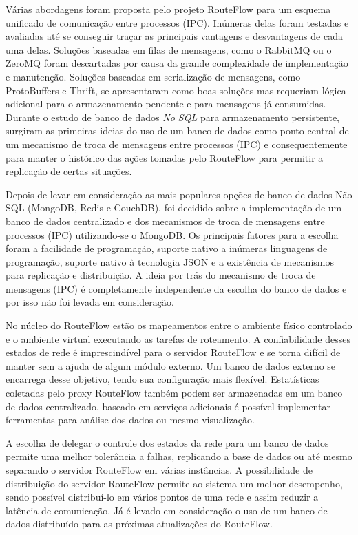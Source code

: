 Várias abordagens foram proposta pelo projeto RouteFlow para um
esquema unificado de comunicação entre processos (IPC). 
Inúmeras delas foram testadas e avaliadas até se conseguir 
traçar as principais vantagens e desvantagens de cada uma delas.
Soluções baseadas em filas de mensagens, como o RabbitMQ
ou o ZeroMQ foram descartadas por causa da grande complexidade
de implementação e manutenção. Soluções baseadas em serialização
de mensagens, como ProtoBuffers e Thrift, se apresentaram como
boas soluções mas requeriam lógica adicional para o armazenamento
pendente e para mensagens já consumidas. Durante o estudo
de banco de dados \textit{No SQL} para armazenamento persistente,
surgiram as primeiras ideias do uso de um banco de dados como
ponto central de um mecanismo de troca de mensagens entre 
processos (IPC) e consequentemente para manter o histórico das 
ações tomadas pelo RouteFlow para permitir a replicação de certas
situações.

Depois de levar em consideração as mais populares opções de 
banco de dados Não SQL (MongoDB, Redis e CouchDB), foi 
decidido sobre a implementação de um banco de dados centralizado
e dos mecanismos de troca de mensagens entre processos (IPC) 
utilizando-se o MongoDB. Os principais fatores para a escolha foram
a facilidade de programação, suporte nativo a inúmeras linguagens de 
programação, suporte nativo à tecnologia JSON e a existência de 
mecanismos para replicação e distribuição. A ideia por trás do
mecanismo de troca de mensagens (IPC) é completamente
independente da escolha do banco de dados e por isso não 
foi levada em consideração.

No núcleo do RouteFlow estão os mapeamentos entre o ambiente
físico controlado e o ambiente virtual executando as tarefas de
roteamento. A confiabilidade desses estados de rede é imprescindível 
para o servidor RouteFlow e se torna difícil de manter sem a ajuda de 
algum módulo externo. Um banco de dados externo se encarrega
desse objetivo, tendo sua configuração mais flexível. Estatísticas
coletadas pelo proxy RouteFlow também podem ser armazenadas em 
um banco de dados centralizado, baseado em serviços adicionais
é possível implementar ferramentas para análise dos dados 
ou mesmo visualização.

A escolha de delegar o controle dos estados da rede para um
banco de dados permite uma melhor tolerância a falhas, replicando
a base de dados ou até mesmo separando o servidor RouteFlow em várias
instâncias. A possibilidade de distribuição do servidor RouteFlow permite
ao sistema um melhor desempenho, sendo possível distribuí-lo
em vários pontos de uma rede e assim reduzir a latência de
comunicação. Já é levado em consideração o uso de um banco de
dados distribuído para as próximas atualizações do RouteFlow.

